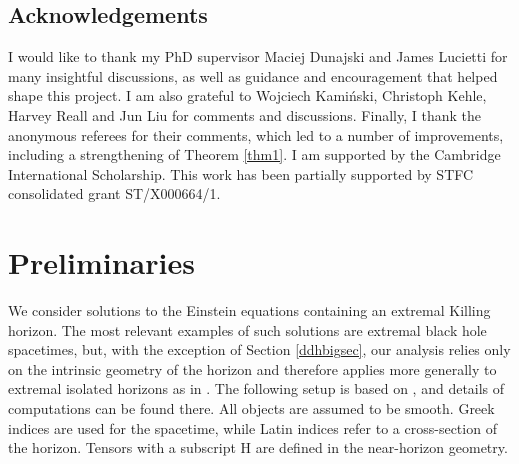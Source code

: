 \documentclass[11pt, reqno]{amsart}
\theoremstyle{plain}
\theoremstyle{definition}
\numberwithin{equation}{section}
\begin{document}
\subsection*{Acknowledgements} I would like to thank my PhD supervisor Maciej Dunajski and James Lucietti for many insightful discussions, as well as guidance and encouragement that helped shape this project. I am also grateful to Wojciech Kami\'nski, Christoph Kehle, Harvey Reall and Jun Liu for comments and discussions. Finally, I thank the anonymous referees for their comments, which led to a number of  improvements, including a strengthening of Theorem \ref{thm1}. I am supported by the Cambridge International Scholarship. This work has been partially supported by STFC consolidated grant ST/X000664/1.

\section{Preliminaries}
We consider solutions to the Einstein equations containing an extremal Killing horizon. The most relevant examples of such solutions are extremal black hole spacetimes, but, with the exception of Section \ref{ddhbigsec}, our analysis relies only on the intrinsic geometry of the horizon and therefore applies more generally to extremal isolated horizons as in \cite{LP02}. The following setup is based on \cite{KL13}, and details of computations can be found there. All objects are assumed to be smooth. Greek indices are used for the spacetime, while Latin indices refer to a cross-section of the horizon. Tensors with a subscript H are defined in the near-horizon geometry.
\end{document}
